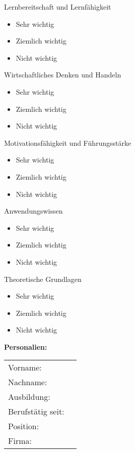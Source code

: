 \documentclass{article}
\begin{document}
Lernbereitschaft und Lernfähigkeit

\begin{itemize}[label={\Square}] 
\item Sehr wichtig
\item Ziemlich wichtig
\item Nicht wichtig
\end{itemize} 
\bigskip 

Wirtschaftliches Denken und Handeln

\begin{itemize}[label={\Square}] 
\item Sehr wichtig
\item Ziemlich wichtig
\item Nicht wichtig
\end{itemize} 
\bigskip 

Motivationsfähigkeit und Führungsstärke

\begin{itemize}[label={\Square}] 
\item Sehr wichtig
\item Ziemlich wichtig
\item Nicht wichtig
\end{itemize} 
\bigskip 

Anwendungswissen

\begin{itemize}[label={\Square}] 
\item Sehr wichtig
\item Ziemlich wichtig
\item Nicht wichtig
\end{itemize} 
\bigskip 

Theoretische Grundlagen

\begin{itemize}[label={\Square}] 
\item Sehr wichtig
\item Ziemlich wichtig
\item Nicht wichtig
\end{itemize} 
\bigskip 

\textbf{Personalien:}

\vspace{0.5cm}

\begin{tabular}{lC{5cm}}
  Vorname: &  \\  
  Nachname: &  \\ 
  Ausbildung: &  \\ 
  Berufstätig seit: & \\ 
  Position:  & \\ 
  Firma:  & \\ 
\end{tabular}
\end{document}
